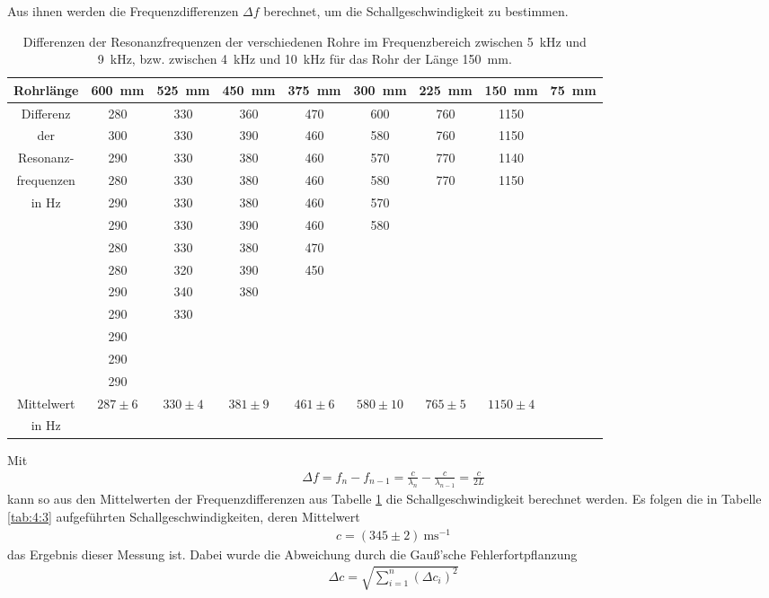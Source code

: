 Aus ihnen werden die Frequenzdifferenzen $\Delta f$ berechnet, um die Schallgeschwindigkeit zu bestimmen.
\begin{table}
\centering
\caption{Differenzen der Resonanzfrequenzen der verschiedenen Rohre im Frequenzbereich zwischen 5~kHz und 9~kHz, bzw. zwischen 4~kHz und 10~kHz für das Rohr der Länge 150~mm.}
\label{tab:4:2}
\begin{tabular}{c c c c c c c c c}
\hline
Rohrlänge  &600~mm&525~mm&450~mm&375~mm&300~mm& 225~mm& 150~mm & 75~mm \\ \hline
Differenz &280&330&360&470&600&760&1150&\\ 
der&300&330&390&460&580&760&1150&  \\ 
Resonanz-&290&330&380&460&570&770&1140&  \\ 
frequenzen&280&330&380&460&580&770&1150&  \\ 
in Hz&290&330&380&460&570&&&  \\ 
&290&330&390&460&580&  &  &  \\ 
&280&330&380&470&&  & &  \\ 
&280&320&390&450&  &  &  &  \\ 
&290&340&380&&  &  &  & \\ 
&290&330&&  &  &  &  &  \\ 
&290&&  &  &  &  &  &  \\ 
&290&  &  &  &  &  &  &  \\ 
&290&  &  &  &  &  &  & \\ 
\hline
Mittelwert&$287\pm 6$&$330\pm 4$&$381\pm 9$&$461\pm 6$&$580\pm 10$&$765\pm 5$&$1150\pm 4$ \\
in Hz &&&&&&&&\\
\hline
\end{tabular}
\end{table}
Mit 
\begin{align}
\Delta f=f_n-f_{n-1}=\frac{c}{\lambda_n}-\frac{c}{\lambda_{n-1}}=\frac{c}{2L}
\label{a:eq:1}
\end{align}
kann so aus den Mittelwerten der Frequenzdifferenzen aus Tabelle \ref{tab:4:2} die Schallgeschwindigkeit berechnet werden.
Es folgen die in Tabelle \ref{tab:4:3} aufgeführten Schallgeschwindigkeiten, deren Mittelwert 
\begin{align*}
c=(345\pm 2)~\text{ms}^{-1}
\end{align*}
das Ergebnis dieser Messung ist. Dabei wurde die Abweichung durch die Gauß'sche Fehlerfortpflanzung
\begin{align*}
\Delta c=\sqrt{\sum_{i=1}^n (\Delta c_i)^2}
\end{align*}
